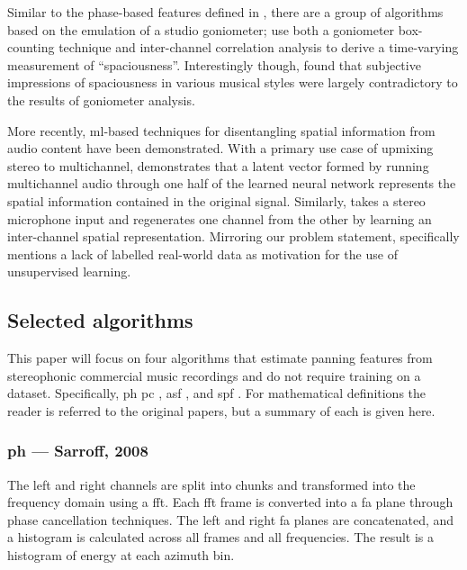 \documentclass[twoside,a4paper]{article}
\begin{document}
Similar to the phase-based features defined in \cite{tardieuProductionEffectAudio2011}, there are a group of algorithms based on the emulation of a studio goniometer; \cite{ziemerAcousticFeaturesRecording2021,ziemerGoniometersArePowerful2023} use both a goniometer box-counting technique and inter-channel correlation analysis to derive a time-varying measurement of \enquote{spaciousness}. Interestingly though, \cite{stirnatSpaciousnessMusicTonmeisters2019} found that subjective impressions of spaciousness in various musical styles were largely contradictory to the results of goniometer analysis.

More recently, \gls{ml}-based techniques for disentangling spatial information from audio content have been demonstrated. With a primary use case of upmixing stereo to multichannel, \cite{yangUpmixingStyleTransfer2022} demonstrates that a latent vector formed by running multichannel audio through one half of the learned neural network represents the spatial information contained in the original signal. Similarly, \cite{yangSelfSupervisedLearningSpatial2024a} takes a stereo microphone input and regenerates one channel from the other by learning an inter-channel spatial representation. Mirroring our problem statement, \cite{yangSelfSupervisedLearningSpatial2024a} specifically mentions a lack of labelled real-world data as motivation for the use of unsupervised learning.

\subsection{Selected algorithms}
\label{ssec:selectedalgorithms}
This paper will focus on four algorithms that estimate panning features from stereophonic commercial music recordings and do not require training on a dataset. Specifically,  \gls{ph} \cite{sarroffMeasurementsSpaciousnessStereophonic2008} \gls{pc} \cite{gomezMusicSimilaritySystems2008}, \gls{asf} \cite{tardieuProductionEffectAudio2011}, and \gls{spf} \cite{tzanetakisStereoPanningFeatures2007}. For mathematical definitions the reader is referred to the original papers, but a summary of each is given here.

\subsubsection{\acrfull{ph} --- Sarroff, 2008 \cite{sarroffMeasurementsSpaciousnessStereophonic2008}}
The left and right channels are split into chunks and transformed into the frequency domain using a \gls{fft}. Each \gls{fft} frame is converted into a \gls{fa} plane through phase cancellation techniques. The left and right \gls{fa} planes are concatenated, and a histogram is calculated across all frames and all frequencies. The result is a histogram of energy at each azimuth bin.
\end{document}

